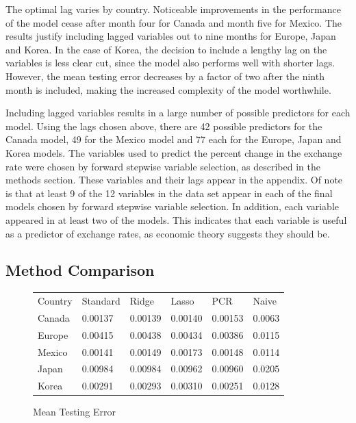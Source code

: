 \documentclass{sig-alternate-05-2015}
\begin{document}
\par{} The optimal lag varies by country. Noticeable improvements in the performance of the model cease after month four for Canada and month five for Mexico. The results justify including lagged variables out to nine months for Europe, Japan and Korea. In the case of Korea, the decision to include a lengthy lag on the variables is less clear cut, since the model also performs well with shorter lags. However, the mean testing error decreases by a factor of two after the ninth month is included, making the increased complexity of the model worthwhile.
\par{} Including lagged variables results in a large number of possible predictors for each model. Using the lags chosen above, there are 42 possible predictors for the Canada model, 49 for the Mexico model and 77 each for the Europe, Japan and Korea models. The variables used to predict the percent change in the exchange rate were chosen by forward stepwise variable selection, as described in the methods section. These variables and their lags appear in the appendix. Of note is that at least 9 of the 12 variables in the data set appear in each of the final models chosen by forward stepwise variable selection. In addition, each variable appeared in at least two of the models. This indicates that each variable is useful as a predictor of exchange rates, as economic theory suggests they should be.

\subsection{Method Comparison}

\begin{figure}
\centering
\caption{Mean Testing Error}
\begin{tabular}{l l l l l l}
Country	& Standard 	& Ridge 		& Lasso 		& PCR 		& Naive \\
Canada 	& 0.00137 	& 0.00139 	& 0.00140 	& 0.00153 	& 0.0063 \\
Europe	& 0.00415 	& 0.00438 	& 0.00434 	& 0.00386 	& 0.0115 \\
Mexico	& 0.00141 	& 0.00149 	& 0.00173 	& 0.00148  & 0.0114 \\
Japan	& 0.00984 	& 0.00984 	& 0.00962 	& 0.00960  & 0.0205 \\
Korea	& 0.00291 	& 0.00293 	& 0.00310 	& 0.00251 	& 0.0128 \\
\end{tabular}
\label{tab:comparison}
\end{figure}
\end{document}
